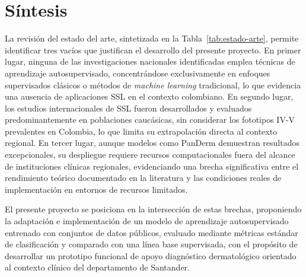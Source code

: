 \section{Síntesis}

La revisión del estado del arte, sintetizada en la Tabla~\ref{tab:estado-arte}, permite identificar tres vacíos que justifican el desarrollo del presente proyecto. En primer lugar, ninguna de las investigaciones nacionales identificadas emplea técnicas de aprendizaje autosupervisado, concentrándose exclusivamente en enfoques supervisados clásicos o métodos de \textit{machine learning} tradicional, lo que evidencia una ausencia de aplicaciones SSL en el contexto colombiano. En segundo lugar, los estudios internacionales de SSL fueron desarrollados y evaluados predominantemente en poblaciones caucásicas, sin considerar los fototipos IV-V prevalentes en Colombia, lo que limita su extrapolación directa al contexto regional. En tercer lugar, aunque modelos como PanDerm demuestran resultados excepcionales, su despliegue requiere recursos computacionales fuera del alcance de instituciones clínicas regionales, evidenciando una brecha significativa entre el rendimiento teórico documentado en la literatura y las condiciones reales de implementación en entornos de recursos limitados.

El presente proyecto se posiciona en la intersección de estas brechas, proponiendo la adaptación e implementación de un modelo de aprendizaje autosupervisado entrenado con conjuntos de datos públicos, evaluado mediante métricas estándar de clasificación y comparado con una línea base supervisada, con el propósito de desarrollar un prototipo funcional de apoyo diagnóstico dermatológico orientado al contexto clínico del departamento de Santander.

